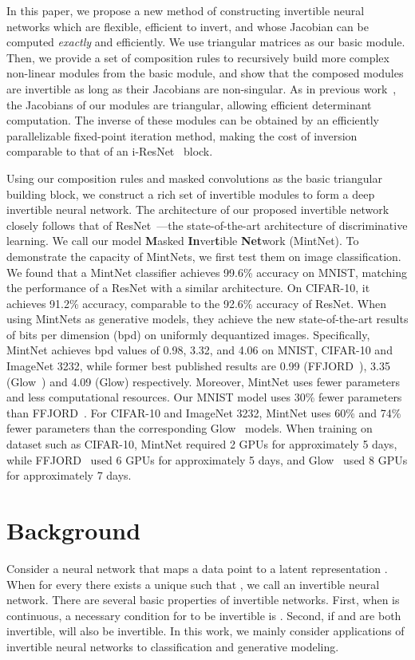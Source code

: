 \documentclass{article}
\begin{document}
In this paper, we propose a new method of constructing invertible neural networks which are flexible, efficient to invert, and whose Jacobian can be computed \emph{exactly} and efficiently.
We use triangular matrices as our basic module. Then, we provide a set of composition rules to recursively build more complex non-linear modules from the basic module, and show that the composed modules are invertible as long as their Jacobians are non-singular. As in previous work~\cite{nvp,maf},
the Jacobians of our modules are triangular, allowing efficient determinant computation. The inverse of these modules can be obtained by an efficiently parallelizable fixed-point iteration method, making the cost of inversion comparable to that of an i-ResNet~\cite{i-resnet} block. 


Using our composition rules and masked convolutions as the basic triangular building block, we construct a rich set of invertible modules to form a deep invertible neural network. The architecture of our proposed invertible network closely follows that of ResNet~\cite{he2016deep}---the state-of-the-art architecture of discriminative learning. We call our model \textbf{M}asked \textbf{In}ver\textbf{t}ible \textbf{Net}work (MintNet). To demonstrate the capacity of MintNets, we first test them on image classification. We found that a MintNet classifier achieves 99.6\% accuracy on MNIST, matching the performance of a ResNet with a similar architecture. On CIFAR-10, it achieves 91.2\% accuracy, comparable to the 92.6\% accuracy of ResNet. When using MintNets as generative models, they achieve the new state-of-the-art results of bits per dimension (bpd) on uniformly dequantized images. Specifically, MintNet achieves bpd values of 0.98, 3.32, and 4.06 on MNIST, CIFAR-10 and ImageNet 3232, while former best published results are 0.99 (FFJORD~\cite{FFJORD}), 3.35 (Glow~\cite{glow}) and 4.09 (Glow) respectively.
Moreover, MintNet uses fewer parameters and less computational resources. Our MNIST model uses 30\% fewer parameters than FFJORD~\cite{FFJORD}. For CIFAR-10 and ImageNet 3232, MintNet uses 60\% and 74\% fewer parameters than the corresponding Glow~\cite{glow} models.
When training on dataset such as CIFAR-10, MintNet required 2 GPUs for approximately 5 days, while FFJORD~\cite{FFJORD} used 6 GPUs for approximately 5 days, and Glow~\cite{glow} used 8 GPUs for approximately 7 days. 

 \section{Background}
Consider a neural network  that maps a data point  to a latent representation . When for every  there exists a unique  such that , we call  an invertible neural network. There are several basic properties of invertible networks. First, when  is continuous, a necessary condition for  to be invertible is . Second, if  and  are both invertible,  will also be invertible. In this work, we mainly consider applications of invertible neural networks to classification and generative modeling.
\end{document}
